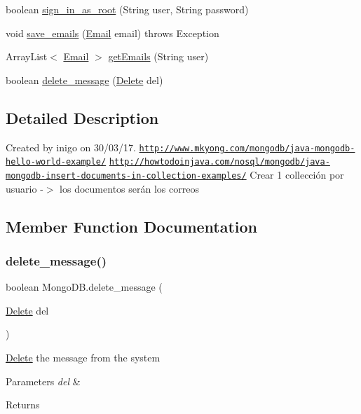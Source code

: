 \begin{DoxyCompactItemize}
\item 
boolean \hyperlink{class_mongo_d_b_afa13d12f56548fcf6c5ca12ec66bc73c}{sign\+\_\+in\+\_\+as\+\_\+root} (String user, String password)
\item 
void \hyperlink{class_mongo_d_b_a2e376b333a71c82b5dd8e054d538e7f4}{save\+\_\+emails} (\hyperlink{class_email}{Email} email)  throws Exception 
\item 
Array\+List$<$ \hyperlink{class_email}{Email} $>$ \hyperlink{class_mongo_d_b_afb31e6d36e9b20ceff3f13901bfc4012}{get\+Emails} (String user)
\item 
boolean \hyperlink{class_mongo_d_b_a1bc531a4e919dd942edeafc749e30f81}{delete\+\_\+message} (\hyperlink{class_delete}{Delete} del)
\end{DoxyCompactItemize}


\subsection{Detailed Description}
Created by inigo on 30/03/17. \href{http://www.mkyong.com/mongodb/java-mongodb-hello-world-example/}{\tt http\+://www.\+mkyong.\+com/mongodb/java-\/mongodb-\/hello-\/world-\/example/} \href{http://howtodoinjava.com/nosql/mongodb/java-mongodb-insert-documents-in-collection-examples/}{\tt http\+://howtodoinjava.\+com/nosql/mongodb/java-\/mongodb-\/insert-\/documents-\/in-\/collection-\/examples/} Crear 1 collección por usuario -\/$>$ los documentos serán los correos 

\subsection{Member Function Documentation}
\mbox{\label{class_mongo_d_b_a1bc531a4e919dd942edeafc749e30f81}} 
\subsubsection{\texorpdfstring{delete\+\_\+message()}{delete\_message()}}
{\footnotesize\ttfamily boolean Mongo\+D\+B.\+delete\+\_\+message (\begin{DoxyParamCaption}\item[{\hyperlink{class_delete}{Delete}}]{del }\end{DoxyParamCaption})}

\hyperlink{class_delete}{Delete} the message from the system 
\begin{DoxyParams}{Parameters}
{\em del} & \\
\hline
\end{DoxyParams}
\begin{DoxyReturn}{Returns}

\end{DoxyReturn}
\mbox{\label{class_mongo_d_b_afb31e6d36e9b20ceff3f13901bfc4012}} 
